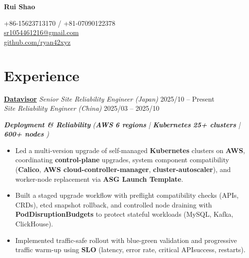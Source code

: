 \documentclass[11pt,a4paper]{article}
\begin{document}

\noindent
\begin{minipage}[t]{0.62\textwidth}
  {\fontsize{22}{24}\selectfont \textbf{Rui Shao}}
\end{minipage}
\hfill
\begin{minipage}[t]{0.36\textwidth}
  \raggedleft
  {\small +86-15623713170 / +81-07090122378}\\
  {\small \href{mailto:sr1054461216@gmail.com}{sr1054461216@gmail.com}}\\
  {\small \href{https://github.com/ryan42xyz}{github.com/ryan42xyz}}
\end{minipage}

\vspace{-2pt}

\section*{Experience}

\noindent
\href{https://www.datavisor.com}{\textbf{Datavisor}} \hfill \textit{Senior Site Reliability Engineer (Japan)} \hfill 2025/10 -- Present \\
 \hfill \textit{Site Reliability Engineer (China)} \hfill 2025/03 -- 2025/10

\vspace{4pt}

\noindent\textbf{\textit{Deployment \& Reliability}} \hfill \textit{(\textbf{AWS} \textbf{6 regions} | \textbf{Kubernetes} \textbf{25+ clusters} | \textbf{600+ nodes} )} \hfill \mbox{}
\begin{itemize}
  \item Led a multi-version upgrade of self-managed \textbf{Kubernetes} clusters on \textbf{AWS}, coordinating \textbf{control-plane} upgrades, system component compatibility (\textbf{Calico}, \textbf{AWS cloud-controller-manager}, \textbf{cluster-autoscaler}), and worker-node replacement via \textbf{ASG Launch Template}.
  \item Built a staged upgrade workflow with preflight compatibility checks (APIs, CRDs), etcd snapshot rollback, and controlled node draining with \textbf{PodDisruptionBudgets} to protect stateful workloads (MySQL, Kafka, ClickHouse).
  \item Implemented traffic-safe rollout with blue-green validation and progressive traffic warm-up using \textbf{SLO} (latency, error rate, critical APIsuccess, restarts).
\end{itemize}
\end{document}
